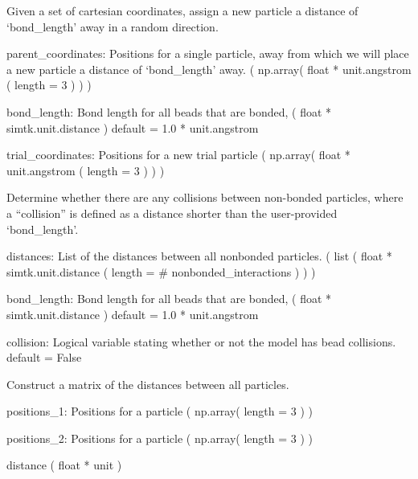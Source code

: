 \documentclass[letterpaper,10pt,english]{sphinxmanual}
\begin{document}
\begin{fulllineitems}
\label{\detokenize{index:utilities.util.attempt_move}}
Given a set of cartesian coordinates, assign a new particle
a distance of ‘bond\_length’ away in a random direction.

parent\_coordinates: Positions for a single particle,
away from which we will place a new particle a distance
of ‘bond\_length’ away.
( np.array( float * unit.angstrom ( length = 3 ) ) )

bond\_length: Bond length for all beads that are bonded,
( float * simtk.unit.distance )
default = 1.0 * unit.angstrom

trial\_coordinates: Positions for a new trial particle
( np.array( float * unit.angstrom ( length = 3 ) ) )

\end{fulllineitems}


\begin{fulllineitems}
\label{\detokenize{index:utilities.util.collisions}}
Determine whether there are any collisions between non-bonded
particles, where a “collision” is defined as a distance shorter
than the user-provided ‘bond\_length’.

distances: List of the distances between all nonbonded particles.
( list ( float * simtk.unit.distance ( length = \# nonbonded\_interactions ) ) )

bond\_length: Bond length for all beads that are bonded,
( float * simtk.unit.distance )
default = 1.0 * unit.angstrom

collision: Logical variable stating whether or not the model has
bead collisions.
default = False

\end{fulllineitems}


\begin{fulllineitems}
\label{\detokenize{index:utilities.util.distance}}
Construct a matrix of the distances between all particles.

positions\_1: Positions for a particle
( np.array( length = 3 ) )

positions\_2: Positions for a particle
( np.array( length = 3 ) )

distance
( float * unit )

\end{fulllineitems}
\end{document}
